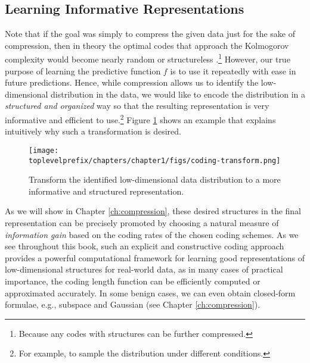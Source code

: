 \documentclass[../../book-main.tex]{subfiles}
\begin{document}
\subsection{Learning Informative Representations}
Note that if the goal was simply to compress the given data just for the sake of compression, then in theory the optimal codes that approach the Kolmogorov complexity would become nearly random or structureless \cite{Chaitin-1966}.\footnote{Because any codes with structures can be further compressed.} However, our true purpose of learning the predictive function $f$ is to use it repeatedly with ease in future predictions. Hence, while compression allows us to identify the low-dimensional distribution in the data, we would like to encode the distribution in a {\em structured and organized} way so that the resulting representation is very informative and efficient to use.\footnote{For example, to sample the distribution under different conditions.} Figure \ref{fig:expansion} shows an example that explains intuitively why such a transformation is desired. 

\begin{figure}
    \centering
    \texttt{[image: \\toplevelprefix/chapters/chapter1/figs/coding-transform.png]}
    \caption{Transform the identified low-dimensional data distribution to a more informative and structured representation.}
    \label{fig:expansion}
\end{figure}
As we will show in Chapter \ref{ch:compression}, these desired structures in the final representation can be precisely promoted by choosing a natural measure of {\em information gain} based on the coding rates of the chosen coding schemes. As we see throughout this book, such an explicit and constructive coding approach provides a powerful computational framework for learning good representations of low-dimensional structures for real-world data, as in many cases of practical importance, the coding length function can be efficiently computed or approximated accurately. In some benign cases, we can even obtain closed-form formulae, e.g., subspace and Gaussian (see Chapter \ref{ch:compression}). 
\end{document}
